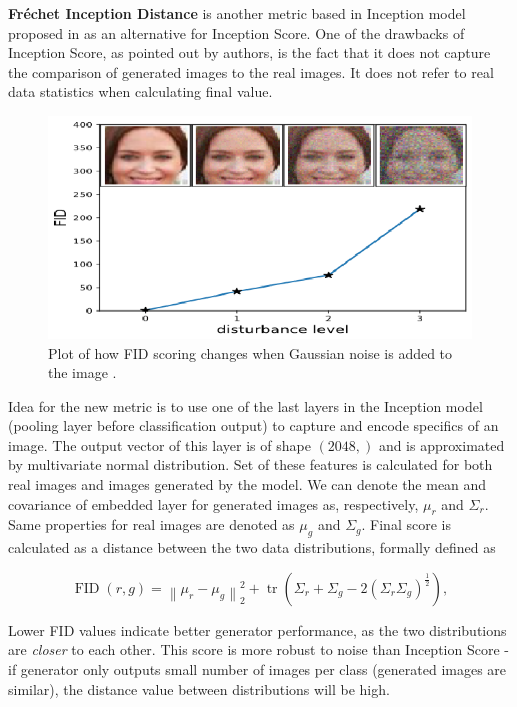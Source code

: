 \documentclass[12pt,a4paper,openany]{book}
\begin{document}
\noindent \textbf{Fr\'echet Inception Distance} is another metric based in Inception model proposed in \cite{fid} as an alternative for Inception Score. One of the drawbacks of Inception Score, as pointed out by authors, is the fact that it does not capture the comparison of generated images to the real images. It does not refer to real data statistics when calculating final value.

 \begin{figure}[ht!]
     \centering
     \includegraphics[scale=1.6]{figs/fid.eps}
     \caption{Plot of how FID scoring changes when Gaussian noise is added to the image \cite{fid}.}\label{Fig:FID}
 \end{figure}
 
Idea for the new metric is to use one of the last layers in the Inception model (pooling layer before classification output) to capture and encode specifics of an image. The output vector of this layer is of shape $(2048,)$ and is approximated by multivariate normal distribution. Set of these features is calculated for both real images and images generated by the model. We can denote the mean and covariance of embedded layer for generated images as, respectively, $\mu_{r}$ and  $\Sigma_{r}$. Same properties for real images are denoted as $\mu_{g}$ and $\Sigma_{g}$. Final score is calculated as a distance between the two data distributions, formally defined as

\begin{equation}
\operatorname{FID}(r, g)=\left\|\mu_{r}-\mu_{g}\right\|_{2}^{2}+\operatorname{tr}\left(\Sigma_{r}+\Sigma_{g}-2\left(\Sigma_{r} \Sigma_{g}\right)^{\frac{1}{2}}\right),
\end{equation}

\noindent Lower FID values indicate better generator performance, as the two distributions are \textit{closer} to each other. This score is more robust to noise than Inception Score - if generator only outputs small number of images per class (generated images are similar), the distance value between distributions will be high.
\end{document}
